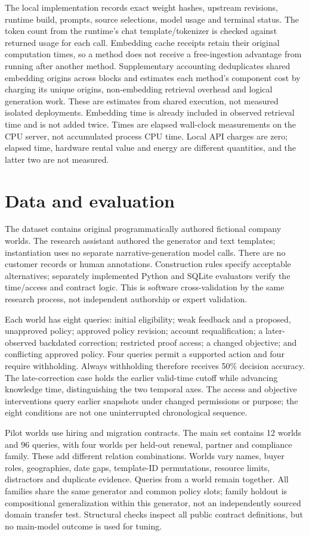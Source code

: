 The local implementation records exact weight hashes, upstream revisions, runtime build, prompts, source selections, model usage and terminal status. The token count from the runtime's chat template/tokenizer is checked against returned usage for each call. Embedding cache receipts retain their original computation times, so a method does not receive a free-ingestion advantage from running after another method. Supplementary accounting deduplicates shared embedding origins across blocks and estimates each method's component cost by charging its unique origins, non-embedding retrieval overhead and logical generation work. These are estimates from shared execution, not measured isolated deployments. Embedding time is already included in observed retrieval time and is not added twice. Times are elapsed wall-clock measurements on the CPU server, not accumulated process CPU time. Local API charges are zero; elapsed time, hardware rental value and energy are different quantities, and the latter two are not measured.

\section{Data and evaluation}
\label{sec:evaluation}
The dataset contains original programmatically authored fictional company worlds. The research assistant authored the generator and text templates; instantiation uses no separate narrative-generation model calls. There are no customer records or human annotations. Construction rules specify acceptable alternatives; separately implemented Python and SQLite evaluators verify the time/access and contract logic. This is software cross-validation by the same research process, not independent authorship or expert validation.

Each world has eight queries: initial eligibility; weak feedback and a proposed, unapproved policy; approved policy revision; account requalification; a later-observed backdated correction; restricted proof access; a changed objective; and conflicting approved policy. Four queries permit a supported action and four require withholding. Always withholding therefore receives 50\% decision accuracy. The late-correction case holds the earlier valid-time cutoff while advancing knowledge time, distinguishing the two temporal axes. The access and objective interventions query earlier snapshots under changed permissions or purpose; the eight conditions are not one uninterrupted chronological sequence.

Pilot worlds use hiring and migration contracts. The main set contains 12 worlds and 96 queries, with four worlds per held-out renewal, partner and compliance family. These add different relation combinations. Worlds vary names, buyer roles, geographies, date gaps, template-ID permutations, resource limits, distractors and duplicate evidence. Queries from a world remain together. All families share the same generator and common policy slots; family holdout is compositional generalization within this generator, not an independently sourced domain transfer test. Structural checks inspect all public contract definitions, but no main-model outcome is used for tuning.

